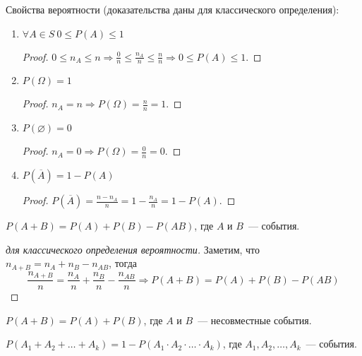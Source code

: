 Свойства вероятности (доказательства даны для классического определения):
\begin{enumerate}
	\item $\forall A \in S \ 0 \leqslant P(A) \leqslant 1$
	\begin{proof}
	$0 \leqslant n_A \leqslant n \Rightarrow
	\frac0n \leqslant \frac{n_A}n \leqslant \frac{n}n \Rightarrow
	0 \leqslant P(A) \leqslant 1$.
	\end{proof}
	
	\item $P(\Omega) = 1$
	\begin{proof}
	$n_A = n \Rightarrow P(\Omega) = \frac{n}n = 1$.
	\end{proof}
	
	\item $P(\varnothing) = 0$
	\begin{proof}
	$n_A = 0 \Rightarrow P(\Omega) = \frac0n = 0$.
	\end{proof}
	
	\item $P(\overline A) = 1 - P(A)$
	\begin{proof}
	$P(\overline A) = \frac{n - n_A}n = 1 - \frac{n_A}n = 1 - P(A)$.
	\end{proof}
\end{enumerate}

\begin{theorem}
$P(A + B) = P(A) + P(B) - P(AB)$, где $A$ и $B$~--- события.
\end{theorem}
\begin{proof}[для классического определения вероятности]
Заметим, что $n_{A + B} = n_A + n_B - n_{AB}$, тогда
\begin{equation*}
\frac{n_{A + B}}n = \frac{n_A}n + \frac{n_B}n - \frac{n_{AB}}n \Rightarrow
P(A + B) = P(A) + P(B) - P(AB)
\end{equation*}
\end{proof}

\begin{consequent}
$P(A + B) = P(A) + P(B)$, где $A$ и $B$~--- несовместные события.
\end{consequent}

\begin{theorem}
$P(A_1 + A_2 + \ldots + A_k) = 1 - P(A_1 \cdot A_2 \cdot \ldots \cdot A_k)$, где $A_1, A_2, \ldots, A_k$~--- события.
\end{theorem}

